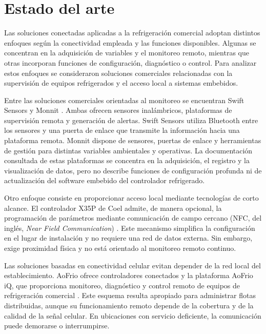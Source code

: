 \section{Estado del arte}

Las soluciones conectadas aplicadas a la refrigeración comercial adoptan distintos enfoques según la conectividad empleada y las funciones disponibles. Algunas se concentran en la adquisición de variables y el monitoreo remoto, mientras que otras incorporan funciones de configuración, diagnóstico o control. Para analizar estos enfoques se consideraron soluciones comerciales relacionadas con la supervisión de equipos refrigerados y el acceso local a sistemas embebidos.

Entre las soluciones comerciales orientadas al monitoreo se encuentran Swift Sensors \cite{SwiftSensors:web} y Monnit \cite{Monnit:web}. Ambas ofrecen sensores inalámbricos, plataformas de supervisión remota y generación de alertas. Swift Sensors utiliza Bluetooth entre los sensores y una puerta de enlace que transmite la información hacia una plataforma remota. Monnit dispone de sensores, puertas de enlace y herramientas de gestión para distintas variables ambientales y operativas. La documentación consultada de estas plataformas se concentra en la adquisición, el registro y la visualización de datos, pero no describe funciones de configuración profunda ni de actualización del software embebido del controlador refrigerado.

Otro enfoque consiste en proporcionar acceso local mediante tecnologías de corto alcance. El controlador X35P de Coel admite, de manera opcional, la programación de parámetros mediante comunicación de campo cercano (NFC, del inglés, \textit{Near Field Communication}) \cite{Coel:web}. Este mecanismo simplifica la configuración en el lugar de instalación y no requiere una red de datos externa. Sin embargo, exige proximidad física y no está orientado al monitoreo remoto continuo.

Las soluciones basadas en conectividad celular evitan depender de la red local del establecimiento. AoFrio ofrece controladores conectados y la plataforma AoFrio iQ, que proporciona monitoreo, diagnóstico y control remoto de equipos de refrigeración comercial \cite{AoFrio:web,AoFrioIQ:web}. Este esquema resulta apropiado para administrar flotas distribuidas, aunque su funcionamiento remoto depende de la cobertura y de la calidad de la señal celular. En ubicaciones con servicio deficiente, la comunicación puede demorarse o interrumpirse.

